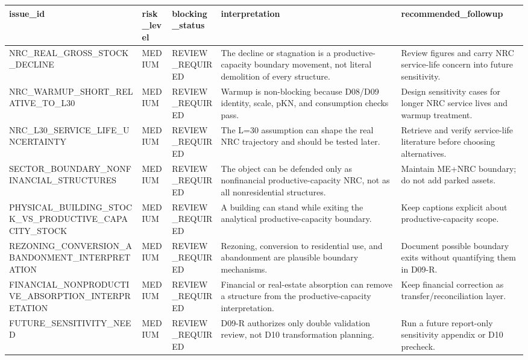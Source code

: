 
\begin{tabular}{lllll}
\toprule
issue\_id & risk\_level & blocking\_status & interpretation & recommended\_followup\\
\midrule
NRC\_REAL\_GROSS\_STOCK\_DECLINE & MEDIUM & REVIEW\_REQUIRED & The decline or stagnation is a productive-capacity boundary movement, not literal demolition of every structure. & Review figures and carry NRC service-life concern into future sensitivity.\\
NRC\_WARMUP\_SHORT\_RELATIVE\_TO\_L30 & MEDIUM & REVIEW\_REQUIRED & Warmup is non-blocking because D08/D09 identity, scale, pKN, and consumption checks pass. & Design sensitivity cases for longer NRC service lives and warmup treatment.\\
NRC\_L30\_SERVICE\_LIFE\_UNCERTAINTY & MEDIUM & REVIEW\_REQUIRED & The L=30 assumption can shape the real NRC trajectory and should be tested later. & Retrieve and verify service-life literature before choosing alternatives.\\
SECTOR\_BOUNDARY\_NONFINANCIAL\_STRUCTURES & MEDIUM & REVIEW\_REQUIRED & The object can be defended only as nonfinancial productive-capacity NRC, not as all nonresidential structures. & Maintain ME+NRC boundary; do not add parked assets.\\
PHYSICAL\_BUILDING\_STOCK\_VS\_PRODUCTIVE\_CAPACITY\_STOCK & MEDIUM & REVIEW\_REQUIRED & A building can stand while exiting the analytical productive-capacity boundary. & Keep captions explicit about productive-capacity scope.\\
\addlinespace
REZONING\_CONVERSION\_ABANDONMENT\_INTERPRETATION & MEDIUM & REVIEW\_REQUIRED & Rezoning, conversion to residential use, and abandonment are plausible boundary mechanisms. & Document possible boundary exits without quantifying them in D09-R.\\
FINANCIAL\_NONPRODUCTIVE\_ABSORPTION\_INTERPRETATION & MEDIUM & REVIEW\_REQUIRED & Financial or real-estate absorption can remove a structure from the productive-capacity interpretation. & Keep financial correction as transfer/reconciliation layer.\\
FUTURE\_SENSITIVITY\_NEED & MEDIUM & REVIEW\_REQUIRED & D09-R authorizes only double validation review, not D10 transformation planning. & Run a future report-only sensitivity appendix or D10 precheck.\\
\bottomrule
\end{tabular}
